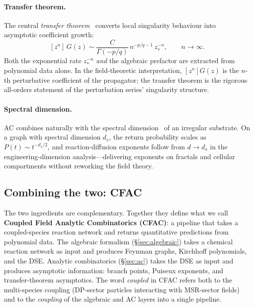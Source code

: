 \documentclass[11pt,a4paper]{article}
\theoremstyle{plain}
\begin{document}
\paragraph{Transfer theorem.}
The central \emph{transfer theorem}~\cite{FlajoletSedgewick}
converts local singularity behaviour into asymptotic coefficient
growth:
\begin{equation}\label{eq:transfer}
  [z^n]\,G(z) \sim \frac{C}{\Gamma(-p/q)}\,n^{-p/q - 1}\,z_*^{-n},
  \qquad n \to \infty.
\end{equation}
Both the exponential rate $z_*^{-n}$ \emph{and} the algebraic
prefactor are extracted from polynomial data alone.  In the
field-theoretic interpretation, $[z^n]G(z)$ is the $n$-th
perturbative coefficient of the propagator; the transfer theorem
is the rigorous all-orders statement of the perturbation
series' singularity structure.

\paragraph{Spectral dimension.}
AC combines naturally with the spectral
dimension~\cite{AlexanderOrbach,Havlin,Hattori} of an irregular
substrate.  On a graph with spectral dimension $d_s$, the return
probability scales as $P(t) \sim t^{-d_s/2}$, and
reaction-diffusion exponents follow from $d \to d_s$ in the
engineering-dimension analysis---delivering exponents on fractals
and cellular compartments without reworking the field theory.

\subsection{Combining the two: CFAC}
\label{sec:combination}

The two ingredients are complementary.  Together they define what
we call \textbf{Coupled Field Analytic Combinatorics (CFAC)}: a
pipeline that takes a coupled-species reaction network and
returns quantitative predictions from polynomial data.  The
algebraic formalism (\S\ref{sec:algebraic}) takes a chemical
reaction network as input and produces Feynman graphs, Kirchhoff
polynomials, and the DSE.  Analytic combinatorics
(\S\ref{sec:ac}) takes the DSE as input and produces asymptotic
information: branch points, Puiseux exponents, and
transfer-theorem asymptotics.  The word \emph{coupled} in CFAC
refers both to the multi-species coupling (DP-sector particles
interacting with MSR-sector fields) and to the \emph{coupling} of
the algebraic and AC layers into a single pipeline.
\end{document}
